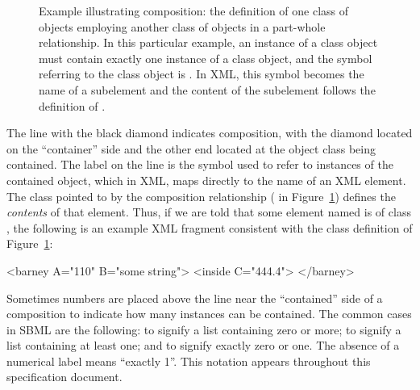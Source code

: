 \begin{figure}[htb]
  \centering
  \small
  \caption{Example illustrating composition: the definition of one
    class of objects employing another class of objects in a
    part-whole relationship.  In this particular example, an
    instance of a  class object must contain exactly
    one instance of a  class object, and the symbol
    referring to the  class object is .
    In XML, this symbol becomes the name of a subelement and the
    content of the subelement follows the definition of
    .}
  \label{fig:subelement-eg}
\end{figure}

The line with the black diamond indicates composition,
with the diamond located on the ``container'' side and the other
end located at the object class being contained.  The label on the
line is the symbol used to refer to instances of the contained
object, which in XML, maps directly to the name of an XML element.
The class pointed to by the composition relationship (
in Figure~\ref{fig:subelement-eg}) defines the \emph{contents} of
that element.  Thus, if we are told that some element named
 is of class , the following is an
example XML fragment consistent with the class definition of
Figure~\ref{fig:subelement-eg}:

\begin{example}
<barney A="110" B="some string">
    <inside C="444.4">
</barney>
\end{example}

Sometimes numbers are placed above the line near the ``contained''
side of a composition to indicate how many instances can be
contained.  The common cases in SBML are the following:
\token{[0..*]} to signify a list containing zero or more;
\token{[1..*]} to signify a list containing at least one; and
\token{[0..1]} to signify exactly zero or one.  The absence of a
numerical label means ``exactly 1''.  This notation appears
throughout this specification document.


